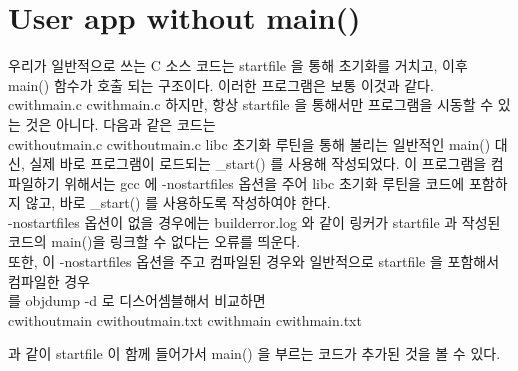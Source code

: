 \documentclass {article}
\begin{document}
\section {User app without main()}
우리가 일반적으로 쓰는 C 소스 코드는 startfile 을 통해 초기화를 거치고, 이후 main() 함수가 호출\linebreak
되는 구조이다. 이러한 프로그램은 보통 이것과 같다.\\
cwithmain.c
{cwithmain.c}
하지만, 항상 startfile 을 통해서만 프로그램을 시동할 수 있는 것은 아니다. 다음과 같은 코드는\\
cwithoutmain.c
{cwithoutmain.c}
libc 초기화 루틴을 통해 불리는 일반적인 main() 대신, 실제 바로 프로그램이 로드되는 \_start() 를 사용해 작성되었다. 이 프로그램을 컴파일하기 위해서는 gcc 에 -nostartfiles 옵션을 주어 libc 초기화 루틴을 코드에 포함하지 않고, 바로 \_start() 를 사용하도록 작성하여야 한다. \\
-nostartfiles 옵션이 없을 경우에는 
{builderror.log}
와 같이 링커가 startfile 과 작성된 코드의 main()을 링크할 수 없다는 오류를 띄운다. \\
또한, 이 -nostartfiles 옵션을 주고 컴파일된 경우와 일반적으로 startfile 을 포함해서 컴파일한 경우\\
를 objdump -d 로 디스어셈블해서 비교하면 \\
cwithoutmain
{cwithoutmain.txt}
cwithmain
{cwithmain.txt}

과 같이 startfile 이 함께 들어가서 main() 을 부르는 코드가 추가된 것을 볼 수 있다.
\end{document}
